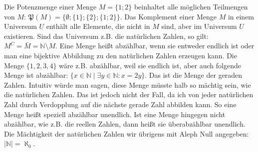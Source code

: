 \documentclass[12pt]{article}
\begin{document}
	 \noindent Die Potenzmenge einer Menge $M=\{1;2\}$ beinhaltet alle möglichen Teilmengen von $M$: $\mathfrak{P}(M)=\{\emptyset;\{1\};\{2\};\{1;2\}\}$.\newline\newline
	 Das Komplement einer Menge $M$ in einem Universum $U$ enthält alle Elemente, die nicht in $M$ sind, aber im Universum $U$ existieren. Sind das Universum z.B. die natürlichen Zahlen, so gilt: $M^C=\bar M=\mathbb{N}\setminus M$.\newline\newline
	 Eine Menge heißt abzählbar, wenn sie entweder endlich ist oder man eine bijektive Abbildung zu den natürlichen Zahlen erzeugen kann. Die Menge $\{1,2,3,4\}$ wäre z.B. abzählbar, weil sie endlich ist, aber auch folgende Menge ist abzählbar: $\{x\in\mathbb{N}\mid\exists y\in\mathbb{N}: x=2y\}$. Das ist die Menge der geraden Zahlen. Intuitiv würde man sagen, diese Menge müsste halb so mächtig sein, wie die natürlichen Zahlen. Das ist jedoch nicht der Fall, da ich von jeder natürlichen Zahl durch Verdopplung auf die nächste gerade Zahl abbilden kann. So eine Menge heißt speziell abzählbar unendlich. Ist eine Menge hingegen nicht abzählbar, wie z.B. die reellen Zahlen, dann heißt sie überabzählbar unendlich. Die Mächtigkeit der natürlichen Zahlen wir übrigens mit Aleph Null angegeben: $\vert\mathbb{N}\vert=\aleph_0$.
\end{document}
